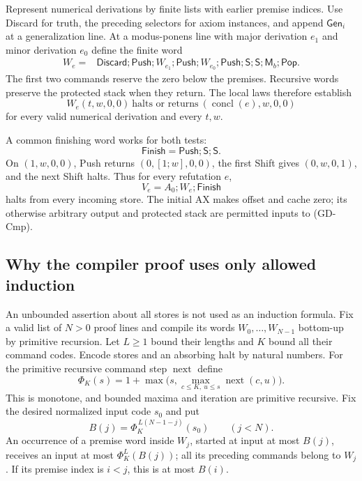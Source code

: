Represent numerical derivations by finite lists with earlier premise
indices.  Use Discard for truth, the preceding selectors for axiom
instances, and append $\mathsf{Gen}_i$ at a generalization line.  At a
modus-ponens line with major derivation $e_1$ and minor derivation $e_0$
define the finite word
\[
\begin{split}
 W_e={}&\mathsf{Discard};\mathsf{Push};W_{e_1};\mathsf{Push};
 W_{e_0};\mathsf{Push};\mathsf S;\mathsf S;
 \mathsf M_b;\mathsf{Pop}.
\end{split}                                             \tag{GD-CmpDef}\label{eq:gd-cmpdef}
\]
The first two commands reserve the zero below the premises.  Recursive
words preserve the protected stack when they return.  The local laws
therefore establish
\[
 W_e(t,w,0,0)\ \text{halts or returns}\
             (\operatorname{concl}(e),w,0,0)             \tag{GD-Cmp}\label{eq:gd-cmp}
\]
for every valid numerical derivation and every $t,w$.

A common finishing word works for both tests:
\[
                    \mathsf{Finish}=\mathsf{Push};\mathsf S;\mathsf S.
\]
On $(1,w,0,0)$, Push returns $(0,[1;w],0,0)$, the first Shift gives
$(0,w,0,1)$, and the next Shift halts.  Thus for every refutation $e$,
\[
                   V_e=A_0;W_e;\mathsf{Finish}            \tag{GD-Ref}\label{eq:gd-ref}
\]
halts from every incoming store.  The initial AX makes offset and cache
zero; its otherwise arbitrary output and protected stack are permitted
inputs to (GD-Cmp).

\subsection{Why the compiler proof uses only allowed induction}

An unbounded assertion about all stores is not used as an induction
formula.  Fix a valid list of $N>0$ proof lines and compile its words
$W_0,\ldots,W_{N-1}$ bottom-up by primitive recursion.  Let $L\ge1$
bound their lengths and $K$ bound all their command codes.  Encode stores
and an absorbing halt by natural numbers.  For the primitive recursive
command step $\operatorname{next}$ define
\[
 \Phi_K(s)=1+\max\bigl(s,
            \max_{c\le K,\ u\le s}\operatorname{next}(c,u)\bigr).
\]
This is monotone, and bounded maxima and iteration are primitive
recursive.  Fix the desired normalized input code $s_0$ and put
\[
              B(j)=\Phi_K^{\,L(N-1-j)}(s_0)\qquad(j<N).
\]
An occurrence of a premise word inside $W_j$, started at input at most
$B(j)$, receives an input at most $\Phi_K^L(B(j))$; all its preceding
commands belong to $W_j$.  If its premise index is $i<j$, this is at most
$B(i)$.

